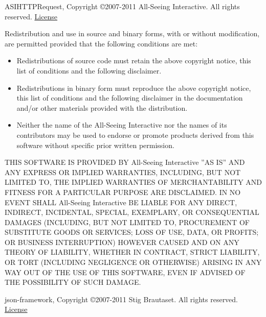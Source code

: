 \documentclass[oneside, openany, 12pt]{tufte-book}
\newcommand{\licensetext}{\scriptsize \setlength{\parskip}{0mm} \singlespacing}
\begin{document}
ASIHTTPRequest, Copyright \copyright 2007-2011 All-Seeing Interactive. All rights reserved. \href{https://raw.github.com/pokeb/asi-http-request/3cb0230e547b0d13d88843ec7fc6ed77d69cb7c6/LICENSE}{License}

{\licensetext Redistribution and use in source and binary forms, with or without
modification, are permitted provided that the following conditions are met:

\begin{itemize}

\item Redistributions of source code must retain the above copyright
notice, this list of conditions and the following disclaimer.
       
       
\item Redistributions in binary form must reproduce the above copyright
notice, this list of conditions and the following disclaimer in the
documentation and/or other materials provided with the distribution.

\item Neither the name of the All-Seeing Interactive nor the
names of its contributors may be used to endorse or promote products
derived from this software without specific prior written permission.
\end{itemize}
THIS SOFTWARE IS PROVIDED BY All-Seeing Interactive ''AS IS'' AND ANY
EXPRESS OR IMPLIED WARRANTIES, INCLUDING, BUT NOT LIMITED TO, THE IMPLIED
WARRANTIES OF MERCHANTABILITY AND FITNESS FOR A PARTICULAR PURPOSE ARE
DISCLAIMED. IN NO EVENT SHALL All-Seeing Interactive BE LIABLE FOR ANY
DIRECT, INDIRECT, INCIDENTAL, SPECIAL, EXEMPLARY, OR CONSEQUENTIAL DAMAGES
(INCLUDING, BUT NOT LIMITED TO, PROCUREMENT OF SUBSTITUTE GOODS OR SERVICES;
LOSS OF USE, DATA, OR PROFITS; OR BUSINESS INTERRUPTION) HOWEVER CAUSED AND
ON ANY THEORY OF LIABILITY, WHETHER IN CONTRACT, STRICT LIABILITY, OR TORT
(INCLUDING NEGLIGENCE OR OTHERWISE) ARISING IN ANY WAY OUT OF THE USE OF THIS
SOFTWARE, EVEN IF ADVISED OF THE POSSIBILITY OF SUCH DAMAGE.}

json-framework, Copyright \copyright 2007-2011 Stig Brautaset. All rights reserved. \href{https://raw.github.com/stig/json-framework/master/LICENSE.md}{License}
\end{document}
